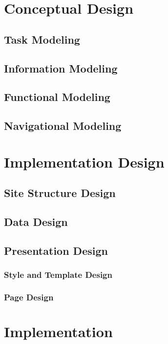 \documentclass[a4paper]{report}
\begin{document}
\chapter{Conceptual Design}
\section{Task Modeling}
\section{Information Modeling}
\section{Functional Modeling}
\section{Navigational Modeling}

\chapter{Implementation Design}
\section{Site Structure Design}
\section{Data Design}
\section{Presentation Design}
\subsection{Style and Template Design}
\subsection{Page Design}

\chapter{Implementation}
\end{document}
